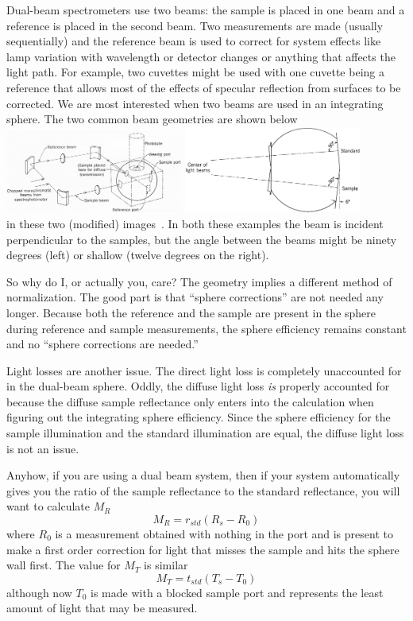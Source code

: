 \documentclass{article}
\begin{document}
Dual-beam spectrometers use two beams:  the sample is placed in one beam
and a reference is placed in the second beam.  Two measurements are made (usually
sequentially) and the reference beam is used to correct for system effects like
lamp variation with wavelength or detector changes or anything that affects the 
light path.  For example, two cuvettes might be used with one cuvette being a
reference that allows most of the effects of specular reflection from surfaces to
be corrected.
We are most interested when two beams are used in an integrating sphere.  
The two common beam geometries are shown below
\\
\includegraphics[width=2.3in]{dual90.png}
\includegraphics[width=2.3in]{dual8.png}\\
in these two (modified) images~\cite{wendlandt66}.  In both these examples
the beam is incident perpendicular to the samples, but the angle between
the beams might be ninety degrees (left) or shallow (twelve degrees on the right).

So why do I, or actually you, care?  The geometry implies a different method
of normalization.  The good part is that ``sphere corrections'' are not needed
any longer.  Because both the reference and the sample are present in the sphere
during reference and sample measurements, the sphere efficiency remains constant
and no ``sphere corrections are needed.''  

Light losses are another issue.  The direct light loss is completely unaccounted
for in the dual-beam sphere.  Oddly, the diffuse light loss \textit{is} properly
accounted for because the diffuse sample reflectance only enters into the calculation
when figuring out the integrating sphere efficiency.  Since the sphere efficiency
for the sample illumination and the standard illumination are equal, the diffuse
light loss is not an issue.

Anyhow, if you are using a dual beam system, then if your system automatically
gives you the ratio of the sample reflectance to the standard reflectance, you
will want to calculate $M_R$ 
$$
M_R = r_{\mathit{std}} (R_s - R_0)
$$
where $R_0$ is a measurement obtained with nothing in the port and is present
to make a first order correction for light that misses the sample and hits the
sphere wall first.  The value for  $M_T$ is similar
$$
M_T = t_{\mathit{std}} (T_s - T_0)
$$
although now $T_0$ is made with a blocked sample port and represents the least amount
of light that may be measured.
\end{document}
